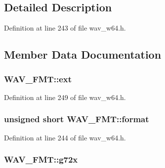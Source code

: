 \subsection{Detailed Description}


Definition at line 243 of file wav\+\_\+w64.\+h.



\subsection{Member Data Documentation}
\subsubsection[{\texorpdfstring{ext}{ext}}]{ W\+A\+V\+\_\+\+F\+M\+T\+::ext}\hypertarget{union_w_a_v___f_m_t_a1c175cc88ca1d2fb62159ea4d042414f}{}\label{union_w_a_v___f_m_t_a1c175cc88ca1d2fb62159ea4d042414f}


Definition at line 249 of file wav\+\_\+w64.\+h.

\subsubsection[{\texorpdfstring{format}{format}}]{\setlength{\rightskip}{0pt plus 5cm}unsigned short W\+A\+V\+\_\+\+F\+M\+T\+::format}\hypertarget{union_w_a_v___f_m_t_a58b72a657d4a1188f5b94cd3a864d3c3}{}\label{union_w_a_v___f_m_t_a58b72a657d4a1188f5b94cd3a864d3c3}


Definition at line 244 of file wav\+\_\+w64.\+h.

\subsubsection[{\texorpdfstring{g72x}{g72x}}]{ W\+A\+V\+\_\+\+F\+M\+T\+::g72x}\hypertarget{union_w_a_v___f_m_t_accc821dcba883b6a0df0eccff1f0b74b}{}\label{union_w_a_v___f_m_t_accc821dcba883b6a0df0eccff1f0b74b}


